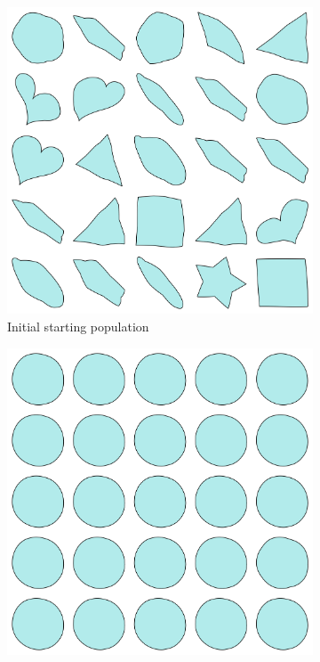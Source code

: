 \documentclass{article}
\begin{document}
\begin{figure}[H]
    \centering
    \begin{subfigure}[b]{0.32\textwidth}
        \centering
        \includegraphics[width=\textwidth]{figures/GAResults/GA13/50_init_pop.png}
        \caption{Initial starting population}
        \label{fig:GA13_starting}
    \end{subfigure}
    \hfill
    \begin{subfigure}[b]{0.32\textwidth}
        \centering
        \includegraphics[width=\textwidth]{figures/GAResults/GA13/latent/final_generation.png}

\end{subfigure}
\end{figure}
\end{document}

